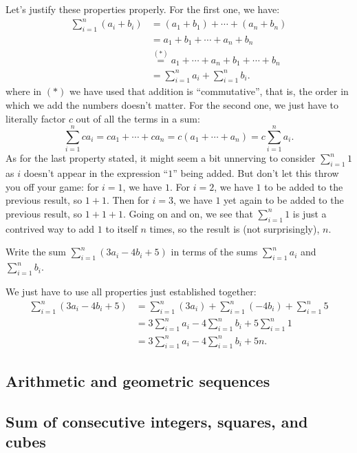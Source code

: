 \documentclass[nooutcomes]{ximera}
\begin{document}
Let's justify these properties properly. For the first one, we have:
\begin{align*}
  \sum_{i=1}^n(a_i+b_i) &= (a_1+b_1) + \cdots + (a_n+b_n) \\ &= a_1+b_1+\cdots + a_n+b_n \\ &\stackrel{(\ast)} = a_1+\cdots + a_n+b_1+\cdots + b_n \\ &= \sum_{i=1}^n a_i+\sum_{i=1}^nb_i.
\end{align*}where in $(\ast)$ we have used that addition is ``commutative'', that is, the order in which we add the numbers doesn't matter. For the second one, we just have to literally factor $c$ out of all the terms in a sum: $$\sum_{i=1}^n ca_i = ca_1+ \cdots + ca_n = c(a_1+\cdots+a_n)=c\sum_{i=1}^n a_i.$$As for the last property stated, it might seem a bit unnerving to consider $\sum_{i=1}^n 1$ as $i$ doesn't appear in the expression ``$1$'' being added. But don't let this throw you off your game: for $i=1$, we have $1$. For $i=2$, we have $1$ to be added to the previous result, so $1+1$. Then for $i=3$, we have $1$ yet again to be added to the previous result, so $1+1+1$. Going on and on, we see that $\sum_{i=1}^n1$ is just a contrived way to add $1$ to itself $n$ times, so the result is (not surprisingly), $n$.

\begin{example}
  Write the sum $\sum_{i=1}^n(3a_i-4b_i+5)$ in terms of the sums $\sum_{i=1}^na_i$ and $\sum_{i=1}^n b_i$.

  \begin{explanation}
    We just have to use all properties just established together:
    \begin{align*}
      \sum_{i=1}^n(3a_i-4b_i+5) &= \sum_{i=1}^n(3a_i) + \sum_{i=1}^n (-4b_i) + \sum_{i=1}^n 5 \\ &= 3\sum_{i=1}^n a_i - 4\sum_{i=1}^nb_i + 5\sum_{i=1}^n 1 \\ &= 3\sum_{i=1}^n a_i - 4\sum_{i=1}^nb_i + 5n.
    \end{align*}

  \end{explanation}
\end{example}


\subsection{Arithmetic and geometric sequences}


\subsection{Sum of consecutive integers, squares, and cubes}
\end{document}
